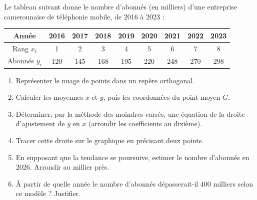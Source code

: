 \documentclass[11pt]{article}
\begin{document}
\begin{exercice}
Le tableau suivant donne le nombre d'abonnés (en milliers) d'une entreprise camerounaise de téléphonie mobile, de 2016 à 2023 :

\begin{center}
\begin{tabular}{|c|c|c|c|c|c|c|c|c|}
\hline
Année & 2016 & 2017 & 2018 & 2019 & 2020 & 2021 & 2022 & 2023 \\
\hline
Rang $x_i$ & 1 & 2 & 3 & 4 & 5 & 6 & 7 & 8 \\
\hline
Abonnés $y_i$ & 120 & 145 & 168 & 195 & 220 & 248 & 270 & 298 \\
\hline
\end{tabular}
\end{center}

\begin{enumerate}
\item Représenter le nuage de points dans un repère orthogonal.
\item Calculer les moyennes $\bar{x}$ et $\bar{y}$, puis les coordonnées du point moyen $G$.
\item Déterminer, par la méthode des moindres carrés, une équation de la droite d'ajustement de $y$ en $x$ (arrondir les coefficients au dixième).
\item Tracer cette droite sur le graphique en précisant deux points.
\item En supposant que la tendance se poursuive, estimer le nombre d'abonnés en 2026. Arrondir au millier près.
\item À partir de quelle année le nombre d'abonnés dépasserait-il 400 milliers selon ce modèle ? Justifier.
\end{enumerate}
\end{exercice}
\end{document}
